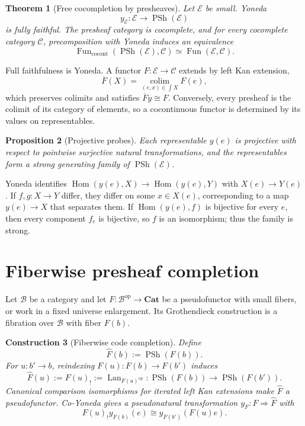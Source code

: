 \documentclass[12pt,a4paper,twoside]{extarticle}
\makeatletter
\theoremstyle{compactplain}
\newtheorem{theorem}{Theorem}[section]
\newtheorem{proposition}[theorem]{Proposition}
\theoremstyle{compactdef}
\newtheorem{construction}[theorem]{Construction}
\renewenvironment{proof}[1][\proofname]{\par\pushQED{\qed}\normalfont
  \topsep2pt\trivlist\item[\hskip\labelsep\bfseries #1\@addpunct{.}]\ignorespaces}
 {\popQED\endtrivlist\@endpefalse}
\newcommand{\PSh}{\operatorname{PSh}}
\newcommand{\Hom}{\operatorname{Hom}}
\newcommand{\Lan}{\operatorname{Lan}}
\newcommand{\colim}{\operatorname*{colim}}
\makeatother
\begin{document}
\begin{theorem}[Free cocompletion by presheaves]
Let $\mathcal E$ be small. Yoneda
\[
y_{\mathcal E}:\mathcal E\to\PSh(\mathcal E)
\]
is fully faithful. The presheaf category is cocomplete, and for every cocomplete category $\mathcal C$, precomposition with Yoneda induces an equivalence
\[
\operatorname{Fun}_{\mathrm{cocont}}(\PSh(\mathcal E),\mathcal C)
\simeq
\operatorname{Fun}(\mathcal E,\mathcal C).
\]
\end{theorem}
\begin{proof}
Full faithfulness is Yoneda. A functor $F:\mathcal E\to\mathcal C$ extends by left Kan extension,
\[
\overline F(X)=\colim_{(e,x)\in\int X}F(e),
\]
which preserves colimits and satisfies $\overline F y\cong F$. Conversely, every presheaf is the colimit of its category of elements, so a cocontinuous functor is determined by its values on representables.
\end{proof}

\begin{proposition}[Projective probes]
Each representable $y(e)$ is projective with respect to pointwise surjective natural transformations, and the representables form a strong generating family of $\PSh(\mathcal E)$.
\end{proposition}
\begin{proof}
Yoneda identifies $\Hom(y(e),X)\to\Hom(y(e),Y)$ with $X(e)\to Y(e)$. If $f,g:X\to Y$ differ, they differ on some $x\in X(e)$, corresponding to a map $y(e)\to X$ that separates them.  If $\Hom(y(e),f)$ is bijective for every $e$, then every component $f_e$ is bijective, so $f$ is an isomorphism; thus the family is strong.
\end{proof}
\section{Fiberwise presheaf completion}
Let $\mathcal B$ be a category and let $F:\mathcal B^{\mathrm{op}}\to\mathbf{Cat}$ be a pseudofunctor with small fibers, or work in a fixed universe enlargement. Its Grothendieck construction is a fibration over $\mathcal B$ with fiber $F(b)$.

\begin{construction}[Fiberwise code completion]
Define
\[
\widehat F(b):=\PSh(F(b)).
\]
For $u:b'\to b$, reindexing $F(u):F(b)\to F(b')$ induces
\[
\widehat F(u):=F(u)_!:=\Lan_{F(u)^{\mathrm{op}}}:\PSh(F(b))\to\PSh(F(b')).
\]
Canonical comparison isomorphisms for iterated left Kan extensions make $\widehat F$ a pseudofunctor. Co-Yoneda gives a pseudonatural transformation $y_F:F\Rightarrow\widehat F$ with
\[
F(u)_!y_{F(b)}(e)\cong y_{F(b')}(F(u)e).
\]
\end{construction}
\end{document}

